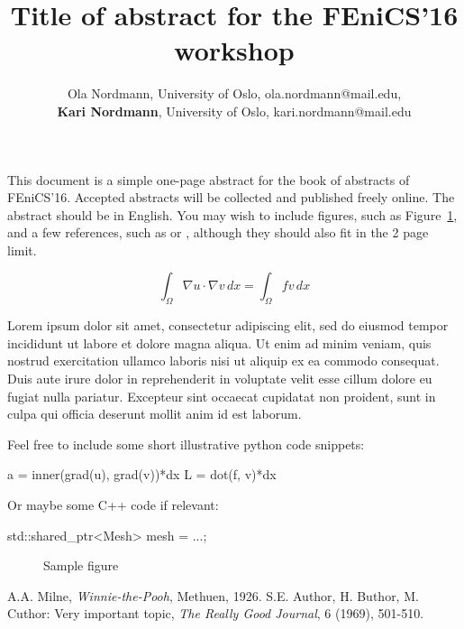 \documentclass[11pt,a4paper]{article}
\begin{document}
\thispagestyle{empty}

\title{Title of abstract for the FEniCS'16 workshop}

\author{Ola Nordmann, University of Oslo, ola.nordmann@mail.edu, \\
\textbf{Kari Nordmann}, University of Oslo, kari.nordmann@mail.edu}

\date{} %
\maketitle\thispagestyle{empty}


This document is a simple one-page abstract for the book of abstracts
of FEniCS'16. Accepted abstracts will be collected and published
freely online.
The abstract should be in English. You may wish to include figures,
such as Figure~\ref{fig5}, and a few references, such as \cite{pu} or
\cite{model}, although they should also fit in the 2 page limit.

\begin{equation}
  \int_\Omega \nabla u \cdot \nabla v\, dx = \int_\Omega f v\, dx
\end{equation}

Lorem ipsum dolor sit amet, consectetur adipiscing elit, sed do
eiusmod tempor incididunt ut labore et dolore magna aliqua. Ut enim ad
minim veniam, quis nostrud exercitation ullamco laboris nisi ut
aliquip ex ea commodo consequat. Duis aute irure dolor in
reprehenderit in voluptate velit esse cillum dolore eu fugiat nulla
pariatur. Excepteur sint occaecat cupidatat non proident, sunt in
culpa qui officia deserunt mollit anim id est laborum.

Feel free to include some short illustrative python code snippets:
\begin{python}
a = inner(grad(u), grad(v))*dx
L = dot(f, v)*dx
\end{python}

Or maybe some C++ code if relevant:
\begin{c++}
std::shared_ptr<Mesh> mesh = ...;
\end{c++}

\begin{figure}[h]
\centerline{}
\caption{Sample figure}
\label{fig5}
\end{figure}

\begin{thebibliography}{00}
 A.A. Milne, \textit{Winnie-the-Pooh}, Methuen, 1926.
 S.E. Author, H. Buthor, M. Cuthor: Very important topic, 
\textit{The Really Good Journal}, 6 (1969), 501-510.
\end{thebibliography}
\end{document}
